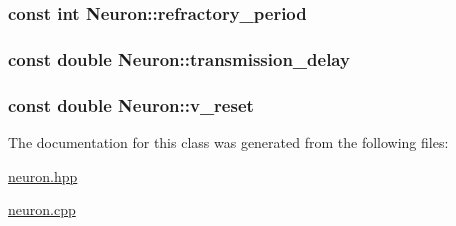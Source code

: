 \subsubsection[{\texorpdfstring{refractory\+\_\+period}{refractory_period}}]{\setlength{\rightskip}{0pt plus 5cm}const int Neuron\+::refractory\+\_\+period\hspace{0.3cm}{\ttfamily [static]}}\hypertarget{class_neuron_a6f7525f237c3d299f58c7a3bf42d62a9}{}\label{class_neuron_a6f7525f237c3d299f58c7a3bf42d62a9}
\subsubsection[{\texorpdfstring{transmission\+\_\+delay}{transmission_delay}}]{\setlength{\rightskip}{0pt plus 5cm}const double Neuron\+::transmission\+\_\+delay\hspace{0.3cm}{\ttfamily [static]}}\hypertarget{class_neuron_a7a3978b9b9da2d1873eabae310a82a43}{}\label{class_neuron_a7a3978b9b9da2d1873eabae310a82a43}
\subsubsection[{\texorpdfstring{v\+\_\+reset}{v_reset}}]{\setlength{\rightskip}{0pt plus 5cm}const double Neuron\+::v\+\_\+reset\hspace{0.3cm}{\ttfamily [static]}}\hypertarget{class_neuron_a060e99d9c0a3b7309137e4930a5d6440}{}\label{class_neuron_a060e99d9c0a3b7309137e4930a5d6440}


The documentation for this class was generated from the following files\+:\begin{DoxyCompactItemize}
\item 
\hyperlink{neuron_8hpp}{neuron.\+hpp}\item 
\hyperlink{neuron_8cpp}{neuron.\+cpp}\end{DoxyCompactItemize}
